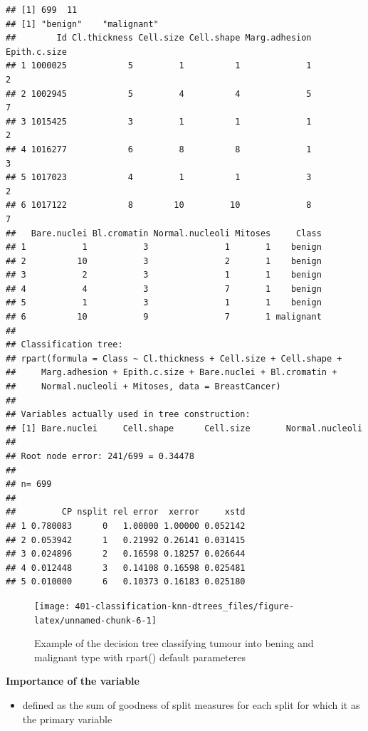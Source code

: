 \documentclass[
]{book}
\providecommand{\tightlist}{%
  \setlength{\itemsep}{0pt}\setlength{\parskip}{0pt}}
\theoremstyle{definition}
\theoremstyle{definition}
\theoremstyle{definition}
\theoremstyle{remark}
\begin{document}
\begin{verbatim}
## [1] 699  11
## [1] "benign"    "malignant"
##        Id Cl.thickness Cell.size Cell.shape Marg.adhesion Epith.c.size
## 1 1000025            5         1          1             1            2
## 2 1002945            5         4          4             5            7
## 3 1015425            3         1          1             1            2
## 4 1016277            6         8          8             1            3
## 5 1017023            4         1          1             3            2
## 6 1017122            8        10         10             8            7
##   Bare.nuclei Bl.cromatin Normal.nucleoli Mitoses     Class
## 1           1           3               1       1    benign
## 2          10           3               2       1    benign
## 3           2           3               1       1    benign
## 4           4           3               7       1    benign
## 5           1           3               1       1    benign
## 6          10           9               7       1 malignant
## 
## Classification tree:
## rpart(formula = Class ~ Cl.thickness + Cell.size + Cell.shape + 
##     Marg.adhesion + Epith.c.size + Bare.nuclei + Bl.cromatin + 
##     Normal.nucleoli + Mitoses, data = BreastCancer)
## 
## Variables actually used in tree construction:
## [1] Bare.nuclei     Cell.shape      Cell.size       Normal.nucleoli
## 
## Root node error: 241/699 = 0.34478
## 
## n= 699 
## 
##         CP nsplit rel error  xerror     xstd
## 1 0.780083      0   1.00000 1.00000 0.052142
## 2 0.053942      1   0.21992 0.26141 0.031415
## 3 0.024896      2   0.16598 0.18257 0.026644
## 4 0.012448      3   0.14108 0.16598 0.025481
## 5 0.010000      6   0.10373 0.16183 0.025180
\end{verbatim}

\begin{figure}

{\centering \texttt{[image: 401-classification-knn-dtrees\_files/figure-latex/unnamed-chunk-6-1]} 

}

\caption{Example of the decision tree classifying tumour into bening and malignant type with rpart() default parameteres}\label{fig:unnamed-chunk-6}
\end{figure}

\textbf{Importance of the variable}

\begin{itemize}
\tightlist
\item
  defined as the sum of goodness of split measures for each split for which it as the primary variable
\end{itemize}
\end{document}
